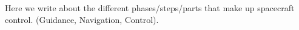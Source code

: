 Here we write about the different phases/steps/parts that make up spacecraft control. (Guidance, Navigation, Control).